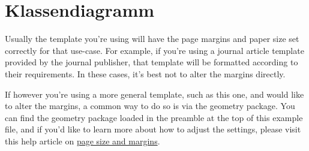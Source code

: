 \documentclass{article}
\begin{document}
\section{Klassendiagramm}

Usually the template you're using will have the page margins and paper size set correctly for that use-case. For example, if you're using a journal article template provided by the journal publisher, that template will be formatted according to their requirements. In these cases, it's best not to alter the margins directly.

If however you're using a more general template, such as this one, and would like to alter the margins, a common way to do so is via the geometry package. You can find the geometry package loaded in the preamble at the top of this example file, and if you'd like to learn more about how to adjust the settings, please visit this help article on \href{https://www.overleaf.com/learn/latex/page_size_and_margins}{page size and margins}.




\end{document}
